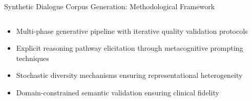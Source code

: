 \begin{frame}{Synthetic Dialogue Corpus Generation: Methodological Framework}
  \begin{columns}
    \begin{column}{0.5\textwidth}
      \begin{itemize}
        \item Multi-phase generative pipeline with iterative quality validation protocols
        
        \item Explicit reasoning pathway elicitation through metacognitive prompting techniques
        
        \item Stochastic diversity mechanisms ensuring representational heterogeneity
        
        \item Domain-constrained semantic validation ensuring clinical fidelity
      \end{itemize}
    \end{column}


\end{columns}
\end{frame}
